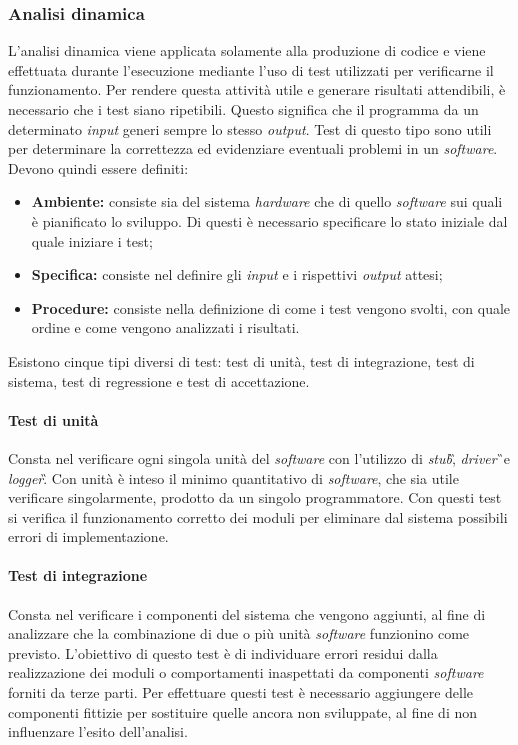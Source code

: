 \subsubsection{Analisi dinamica}
L'analisi dinamica viene applicata solamente alla produzione di codice e viene effettuata durante l'esecuzione mediante l'uso di test utilizzati per verificarne il funzionamento. Per rendere questa attività utile e generare risultati attendibili, è 
necessario che i test siano ripetibili. Questo significa che il programma da 
un determinato \textit{input} generi sempre lo stesso \textit{output}. Test di questo tipo sono 
utili per determinare la correttezza ed evidenziare eventuali problemi in un 
\textit{software}. Devono quindi essere definiti:
\begin{itemize}
	\item \textbf{Ambiente:} consiste sia del sistema \textit{hardware} che di quello \textit{software} sui quali è pianificato lo sviluppo. Di questi è necessario specificare lo stato iniziale dal quale iniziare i test;
	\item \textbf{Specifica:} consiste nel definire gli \textit{input} e i rispettivi \textit{output} attesi;
	\item \textbf{Procedure:} consiste nella definizione di come i test vengono svolti, con quale ordine e come vengono analizzati i risultati.
\end{itemize}
Esistono cinque tipi diversi di test: test di unità, test di integrazione, test di sistema, test di regressione e test di accettazione.

\paragraph{Test di unità}

Consta nel verificare ogni singola unità del \textit{software} con l'utilizzo di 
\textit{stub}\G, \textit{driver}\G\ e \textit{logger}\G.
Con unità è inteso il minimo quantitativo di \textit{software}, che sia utile verificare 
singolarmente, prodotto da un singolo programmatore. Con questi test si 
verifica il funzionamento corretto dei moduli per eliminare dal sistema 
possibili errori di implementazione.

\paragraph{Test di integrazione}

Consta nel verificare i componenti del sistema che vengono aggiunti, al fine di 
analizzare che la combinazione di due o più unità \textit{software} funzionino come 
previsto.
L'obiettivo di questo test è di individuare errori residui dalla 
realizzazione dei moduli o comportamenti inaspettati da componenti \textit{software} 
forniti da terze parti. Per effettuare questi test è necessario aggiungere 
delle componenti fittizie per sostituire quelle ancora non sviluppate, al fine 
di non influenzare l'esito dell'analisi.

